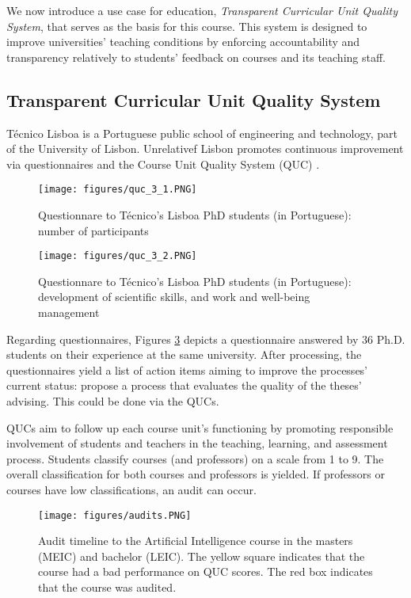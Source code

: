 \documentclass[12pt,a4paper]{article}
\theoremstyle{definition}
\begin{document}
We now introduce a use case for education, \emph{Transparent Curricular Unit Quality System}, that serves as the basis for this course. This system is designed to improve universities' teaching conditions by enforcing accountability and transparency relatively to students' feedback on courses and its teaching staff.

\subsection{Transparent Curricular Unit Quality System}
Técnico Lisboa is a Portuguese public school of engineering and technology, part of the University of Lisbon. Unrelativef Lisbon promotes continuous improvement via questionnaires and the Course Unit Quality System (QUC) \cite{quc}.


\begin{figure}
\centering
\texttt{[image: figures/quc\_3\_1.PNG]}
\caption{Questionnare to Técnico's Lisboa PhD students (in Portuguese): number of participants}
\label{fig:quc_3_1}
\end{figure}

\begin{figure}
\centering
\texttt{[image: figures/quc\_3\_2.PNG]}
\caption{Questionnare to Técnico's Lisboa PhD students (in Portuguese): development of scientific skills, and work and well-being management}
\label{fig:quc_3_1}
\end{figure}

Regarding questionnaires, Figures \ref{fig:quc_3_1} depicts a questionnaire answered by 36 Ph.D. students on their experience at the same university. After processing, the questionnaires yield a list of action items aiming to improve the processes' current status: propose a process that evaluates the quality of the theses' advising. This could be done via the QUCs.

QUCs aim to follow up each course unit's functioning by promoting responsible involvement of students and teachers in the teaching, learning, and assessment process. Students classify courses (and professors) on a scale from 1 to 9. The overall classification for both courses and professors is yielded. If professors or courses have low classifications, an audit can occur.


\begin{figure}
\centering
\texttt{[image: figures/audits.PNG]}
\caption{Audit timeline to the Artificial Intelligence course in the masters (MEIC) and bachelor (LEIC). The yellow square indicates that the course had a bad performance on QUC scores. The red box indicates that the course was audited.}
\label{fig:quc_3_1}
\end{figure}
\end{document}
